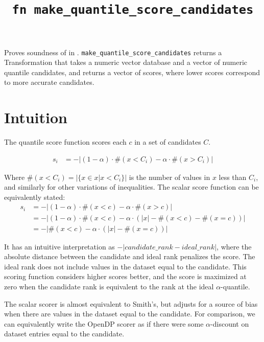 \documentclass{article}
\title{\texttt{fn make\_quantile\_score\_candidates}}
\author{\MichaelShoemateAuthor \and \ChristianCovingtonAuthor \and \IraGlobusHarrusAuthor}
\begin{document}
\maketitle


\contrib

Proves soundness of 
in .
\texttt{make\_quantile\_score\_candidates} returns a Transformation that
takes a numeric vector database and a vector of numeric quantile candidates,
and returns a vector of scores, where lower scores correspond to more accurate candidates.

\section{Intuition}
The quantile score function scores each $c$ in a set of candidates $C$.

\begin{equation}
\begin{array}{rl}
    s_i &= -|(1 - \alpha) \cdot \#(x < C_i) - \alpha \cdot \#(x > C_i)|
\end{array}
\end{equation}

Where $\#(x < C_i) = |\{x \in x | x < C_i\}|$ is the number of values in $x$ less than $C_i$,
and similarly for other variations of inequalities.
The scalar score function can be equivalently stated:
\begin{align}
    s_i &= -|(1 - \alpha) \cdot \#(x < c) - \alpha \cdot \#(x > c)| \\
    &= -|(1 - \alpha) \cdot \#(x < c) - \alpha \cdot (|x| - \#(x < c) - \#(x = c))| \\
    &= -|\#(x < c) - \alpha \cdot (|x| - \#(x = c))|
\end{align}

It has an intuitive interpretation as $-|candidate\_rank - ideal\_rank|$,
where the absolute distance between the candidate and ideal rank penalizes the score.
The ideal rank does not include values in the dataset equal to the candidate.
This scoring function considers higher scores better,
and the score is maximized at zero when the candidate rank is equivalent to the rank at the ideal $\alpha$-quantile.

The scalar scorer is almost equivalent to Smith's\cite{Smith11}, but adjusts for a source of bias when there are values in the dataset equal to the candidate.
For comparison, we can equivalently write the OpenDP scorer as if there were some $\alpha$-discount on dataset entries equal to the candidate.
\end{document}

